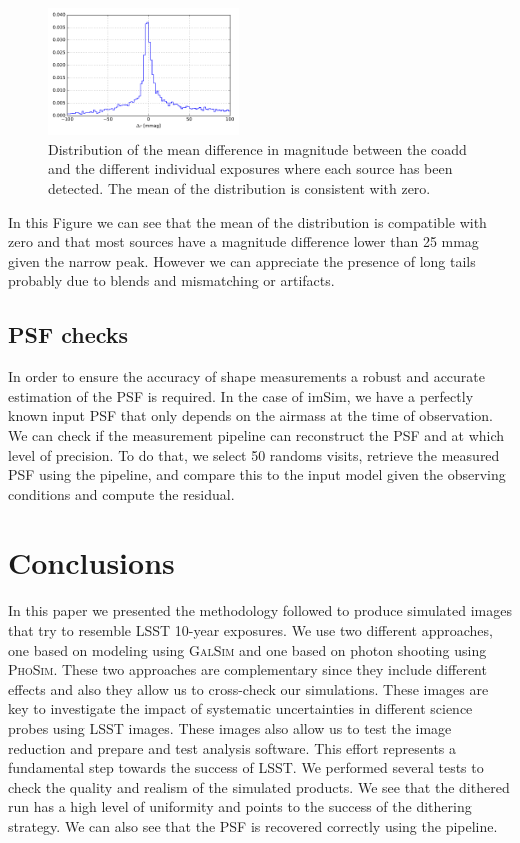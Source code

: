 \documentclass[\docopts]{\docclass}
\begin{document}
\begin{figure}
  \centering
  \includegraphics[width=0.45\textwidth]{photometry_internal_10visits_imsim_undithered}
  \caption{Distribution of the mean difference in magnitude between the coadd and the different individual exposures
  where each source has been detected. The mean of the distribution is consistent with zero.}
  \label{fig:internal_photometry_a}
\end{figure}

In this Figure we can see that the mean of the distribution is compatible with zero and that most sources have a magnitude difference lower
than 25 mmag given the narrow peak. However we can appreciate the presence of long tails probably due to blends and mismatching or artifacts.

\subsection{PSF checks}
\label{sec:psf_checks}

In order to ensure the accuracy of shape measurements a robust and accurate estimation of the PSF is required. In the case of imSim, we have
a perfectly known input PSF that only depends on the airmass at the time of observation. We can check if the measurement pipeline can reconstruct
the PSF and at which level of precision. To do that, we select 50 randoms visits, retrieve the measured PSF using the pipeline, and compare this
to the input model given the observing conditions and compute the residual.

\section{Conclusions}
\label{sec:conclusions}

In this paper we presented the methodology followed to produce simulated images that try to resemble LSST 10-year exposures. We use two different
approaches, one based on modeling using \textsc{GalSim} and one based on photon shooting using \textsc{PhoSim}. These two approaches are complementary
since they include different effects and also they allow us to cross-check our simulations. These images are key to investigate
the impact of systematic uncertainties in different science probes using LSST images. These images also allow us to test the image reduction and
prepare and test analysis software. This effort represents a fundamental step towards the success of LSST. We performed several tests to check the
quality and realism of the simulated products. We see that the dithered run has a high level of uniformity and points to the success of the dithering
strategy. We can also see that the PSF is recovered correctly using the pipeline.
\end{document}
